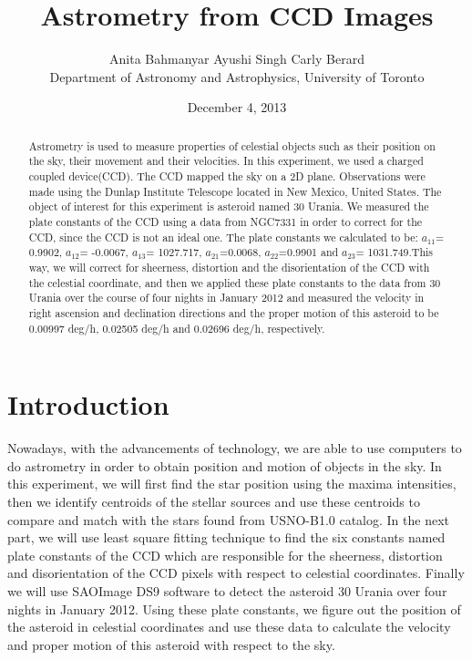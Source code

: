 \documentclass[letterpaper,12pt]{article}
\title{Astrometry from CCD Images }
\author{Anita Bahmanyar \qquad Ayushi Singh \qquad Carly Berard \\Department of Astronomy and Astrophysics, University of Toronto}
\affil{\small {anita.bahmanyar@mail.utoronto.ca}}
\date{December 4, 2013}
\begin{document}
\maketitle

\begin{abstract}
\label{abstract}
Astrometry is used to measure properties of celestial objects such as their position on the sky, their movement and their velocities. In this experiment, we used a charged coupled device(CCD). The CCD mapped the sky on a 2D plane. Observations were made using the Dunlap Institute Telescope located in New Mexico, United States. The object of interest for this experiment is asteroid named 30 Urania. We measured the plate constants of the CCD using a data from NGC7331 in order to correct for the CCD, since the CCD is not an ideal one. The plate constants we calculated to be: \begin{math} a_{11} \end{math}= 0.9902,  \begin{math} a_{12} \end{math}= -0.0067,  \begin{math} a_{13} \end{math}= 1027.717,  \begin{math} a_{21} \end{math}=0.0068,  \begin{math} a_{22} \end{math}=0.9901 and  \begin{math} a_{23} \end{math}= 1031.749.This way, we will correct for sheerness, distortion and the disorientation of the CCD with the celestial coordinate, and then we applied these plate constants to the data from 30 Urania over the course of four nights in January 2012 and measured the velocity in right ascension and declination directions and the proper motion of this asteroid to be 0.00997 deg/h, 0.02505 deg/h and 0.02696 deg/h, respectively.

\end{abstract}

\section{Introduction}
\label{sec:introduction}
Nowadays, with the advancements of technology, we are able to use computers to do astrometry in order to obtain position and motion of objects in the sky. In this experiment, we will first find the star position using the maxima intensities, then we identify centroids of the stellar sources and use these centroids to compare  and match with the stars found from USNO-B1.0 catalog. In the next part, we will use least square fitting technique to find the six constants named plate constants of the CCD which are responsible for the sheerness, distortion and disorientation of the CCD pixels with respect to celestial coordinates. Finally we will use SAOImage DS9 software to detect the asteroid 30 Urania over four nights in January 2012. Using these plate constants, we figure out the position of the asteroid in celestial coordinates and use these data to calculate the velocity and proper motion of this asteroid with respect to the sky.
\end{document}
